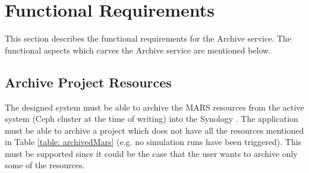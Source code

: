 
\section{Functional Requirements}
    \label{section:functionalReq}
    This section describes the functional requirements for the Archive service.
    The functional aspects which carves the Archive service are mentioned below.

    \subsection{Archive Project Resources}
        The designed system must be able to archive the MARS resources from the active system (Ceph cluster at the time of writing) 
        into the Synology \cite{Synology}. The application must
        be able to archive a project which does not have all the resources mentioned in Table \ref{table: archivedMars} (e.g. no simulation runs have been triggered).
        This must be supported since it could be the case that the user wants to archive only some of the resources.
        
